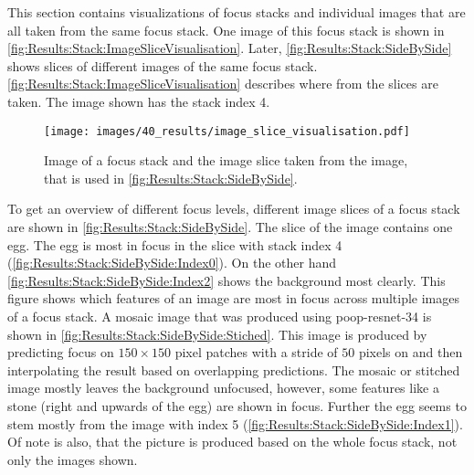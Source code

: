 This section contains visualizations of focus stacks and individual images that are all taken from the same focus stack. One image of this focus stack is shown in \autoref{fig:Results:Stack:ImageSliceVisualisation}. Later, \autoref{fig:Results:Stack:SideBySide} shows slices of different images of the same focus stack. \autoref{fig:Results:Stack:ImageSliceVisualisation} describes where from the slices are taken. The image shown has the stack index 4.

\begin{figure}
    \centering
    \texttt{[image: images/40\_results/image\_slice\_visualisation.pdf]}
    \caption[Example focus stack image]{Image of a focus stack and the image slice taken from the image, that is used in \autoref{fig:Results:Stack:SideBySide}.}
    \label{fig:Results:Stack:ImageSliceVisualisation}
\end{figure}


To get an overview of different focus levels, different image slices of a focus stack are shown in \autoref{fig:Results:Stack:SideBySide}. The slice of the image contains one egg. The egg is most in focus in the slice with stack index 4 (\autoref{fig:Results:Stack:SideBySide:Index0}). On the other hand \autoref{fig:Results:Stack:SideBySide:Index2} shows the background most clearly. This figure shows which features of an image are most in focus across multiple images of a focus stack. A mosaic image that was produced using \acs{poop}-\acs{resnet}-34 is shown in \autoref{fig:Results:Stack:SideBySide:Stiched}. This image is produced by predicting focus on $150 \times 150$ pixel patches with a stride of $50$ pixels on and then interpolating the result based on overlapping predictions. The mosaic or stitched image mostly leaves the background unfocused, however, some features like a stone (right and upwards of the egg) are shown in focus. Further the egg seems to stem mostly from the image with index 5 (\autoref{fig:Results:Stack:SideBySide:Index1}). Of note is also, that the picture is produced based on the whole focus stack, not only the images shown.

